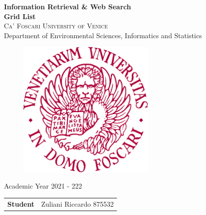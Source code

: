 \begin{titlepage}
    \vspace*{1 cm}
    \begin{center}
         {\LARGE \textbf{Information Retrieval \& Web Search \\ Grid List}\\}
        \vspace{2 cm}
        \textsc{Ca' Foscari University of Venice}\\
        Department of Environmental Sciences, Informatics and Statistics\\
        \vspace{0.2 cm}
        \begin{figure}[h!]
        	\centering
        	\includegraphics[width=0.6\textwidth]{logo} 
        \end{figure}
        Academic Year 2021 - 222\\
        \vspace{3.0 cm}
        	
        \begin{flushleft}
        	\begin{tabular}{l l}
        		\textbf{Student} & Zuliani Riccardo 875532\\
        	\end{tabular}
        \end{flushleft}
    \end{center}
\end{titlepage}

